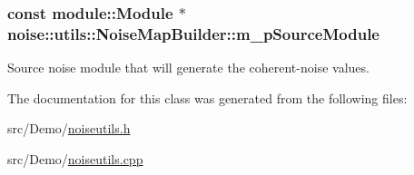 \hypertarget{classnoise_1_1utils_1_1_noise_map_builder_a45b357c74061bc078bc800605c3c1636}{
\subsubsection[{m\+\_\+p\+Source\+Module}]{\setlength{\rightskip}{0pt plus 5cm}const module\+::\+Module $\ast$ noise\+::utils\+::\+Noise\+Map\+Builder\+::m\+\_\+p\+Source\+Module\hspace{0.3cm}{\ttfamily [protected]}}}\label{classnoise_1_1utils_1_1_noise_map_builder_a45b357c74061bc078bc800605c3c1636}


Source noise module that will generate the coherent-\/noise values. 



The documentation for this class was generated from the following files\+:\begin{DoxyCompactItemize}
\item 
src/\+Demo/\hyperlink{_demo_2noiseutils_8h}{noiseutils.\+h}\item 
src/\+Demo/\hyperlink{_demo_2noiseutils_8cpp}{noiseutils.\+cpp}\end{DoxyCompactItemize}
